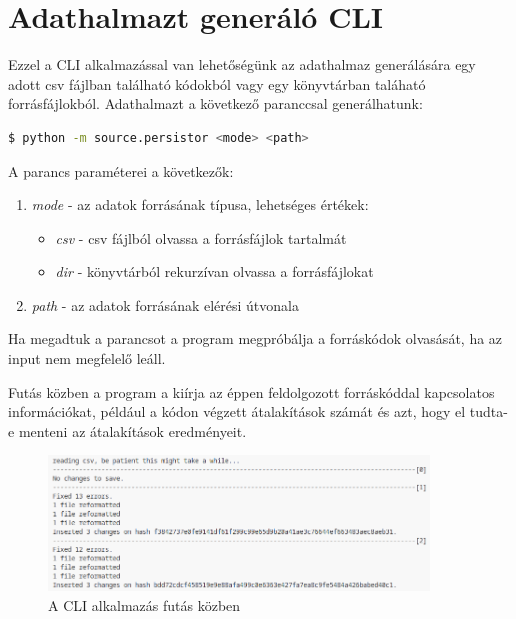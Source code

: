 \section{Adathalmazt generáló CLI}

Ezzel a CLI alkalmazással van lehetőségünk az adathalmaz generálására egy
adott csv fájlban található kódokból vagy egy könyvtárban taláható forrásfájlokból.
Adathalmazt a következő paranccsal generálhatunk:

\begin{lstlisting}[language=bash]
	$ python -m source.persistor <mode> <path>
\end{lstlisting}

A parancs paraméterei a következők:

\begin{enumerate}
	\item\label{step:first} \emph{mode} - az adatok forrásának típusa,
	lehetséges értékek:
	\begin{itemize}
		\item \emph{csv} - csv fájlból olvassa a forrásfájlok tartalmát
		\item \emph{dir} - könyvtárból rekurzívan olvassa a forrásfájlokat
	\end{itemize}
	\item \emph{path} - az adatok forrásának elérési útvonala
\end{enumerate}

Ha megadtuk a parancsot a program megpróbálja a forráskódok olvasását,
ha az input nem megfelelő leáll.

Futás közben a program a kiírja az éppen feldolgozott forráskóddal kapcsolatos információkat,
például a kódon végzett átalakítások számát és azt, hogy el tudta-e menteni az átalakítások eredményeit.

\begin{figure}[H]
	\centering
	\includegraphics[width=0.9\textwidth,frame]{images/screenshots/log.png}
	\caption{A CLI alkalmazás futás közben}
\end{figure}

\pagebreak

